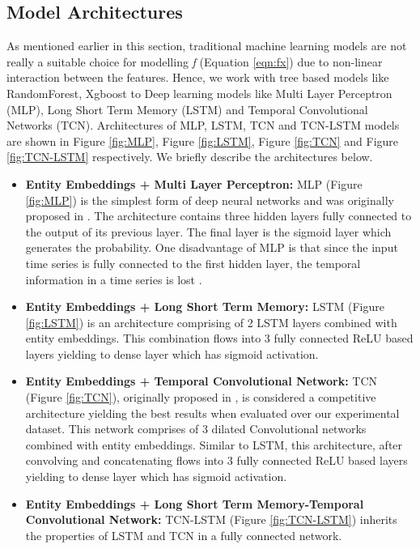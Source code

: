 \subsection{Model Architectures}
As mentioned earlier in this section, traditional machine learning models are not really a suitable choice for modelling \emph{f} 
(Equation \ref{eqn:fx}) due to non-linear interaction between the features. Hence, we work with
tree based models like RandomForest, Xgboost \cite{chen2016xgboost} 
to Deep learning models like Multi Layer Perceptron (MLP), Long Short 
Term Memory (LSTM) and Temporal Convolutional Networks (TCN). Architectures of MLP, LSTM, TCN \cite{lea2016temporal} 
and TCN-LSTM \cite{karim2017lstm} models are shown in Figure \ref{fig:MLP}, Figure \ref{fig:LSTM}, Figure \ref{fig:TCN}
and Figure \ref{fig:TCN-LSTM} respectively. We briefly describe the architectures below.
\begin{itemize}
\item {\bf Entity Embeddings + Multi Layer Perceptron:} MLP (Figure \ref{fig:MLP}) is the simplest form of deep neural networks 
and was originally proposed in \cite{wang2017time}. The architecture contains 
three hidden layers fully connected to the output of its previous layer. The final layer 
is the sigmoid layer which generates the probability. One disadvantage of MLP is that since the input time 
series is fully connected to the first hidden layer, the temporal information in a time series is lost \cite{fawaz2019deep1}.
\item {\bf Entity Embeddings + Long Short Term Memory:} LSTM (Figure \ref{fig:LSTM}) is an
architecture comprising of 2 LSTM layers combined with entity embeddings. This combination flows into 
3 fully connected ReLU based layers yielding to dense layer which has sigmoid activation.
\item {\bf Entity Embeddings + Temporal Convolutional Network:} TCN (Figure \ref{fig:TCN}), originally
proposed in \cite{lea2016temporal} , is considered a competitive architecture yielding the best results when evaluated over 
our experimental dataset. This network comprises of 3 dilated Convolutional networks combined with entity embeddings.
Similar to LSTM, this architecture, after convolving and concatenating flows into 
3 fully connected ReLU based layers yielding to dense layer which has sigmoid activation.
\item {\bf Entity Embeddings + Long Short Term Memory-Temporal Convolutional Network:} TCN-LSTM (Figure \ref{fig:TCN-LSTM})
inherits the properties of LSTM and TCN in a fully connected network.
\end{itemize}
